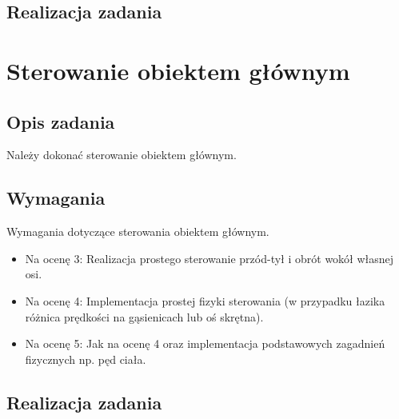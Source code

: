 \documentclass[a4paper, 12pt]{report}
\begin{document}
\section{Realizacja zadania}

\chapter{Sterowanie obiektem głównym}
\section{Opis zadania}
Należy dokonać sterowanie obiektem głównym.
\section{Wymagania}
Wymagania dotyczące sterowania obiektem głównym.
\begin{itemize}
\item Na ocenę 3: Realizacja prostego sterowanie przód-tył i obrót wokół własnej osi.
\item Na ocenę 4: Implementacja prostej fizyki sterowania (w przypadku łazika różnica prędkości na gąsienicach lub oś skrętna).
\item Na ocenę 5: Jak na ocenę 4 oraz implementacja podstawowych zagadnień fizycznych np. pęd ciała.
\end{itemize}
\section{Realizacja zadania}
\end{document}
